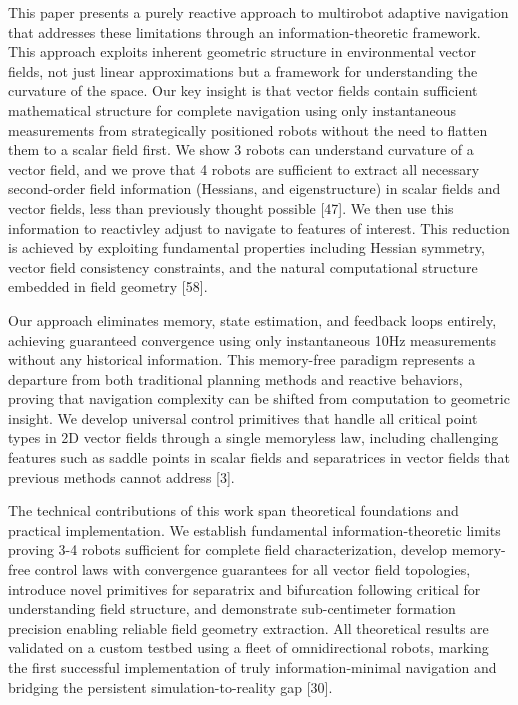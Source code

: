 \documentclass{article}
\begin{document}
This paper presents a purely reactive approach to multirobot adaptive navigation that addresses these limitations through an information-theoretic framework. This approach exploits inherent geometric structure in environmental vector fields, not just linear approximations but a framework for understanding the curvature of the space. Our key insight is that vector fields contain sufficient mathematical structure for complete navigation using only instantaneous measurements from strategically positioned robots without the need to flatten them to a scalar field first. We show 3 robots can understand curvature of a vector field, and we prove that 4 robots are sufficient to extract all necessary second-order field information (Hessians, and eigenstructure) in scalar fields and vector fields,  less than previously thought possible [47].  We then use this information to reactivley adjust to navigate to features of interest. This reduction is achieved by exploiting fundamental properties including Hessian symmetry, vector field consistency constraints, and the natural computational structure embedded in field geometry [58].

Our approach eliminates memory, state estimation, and feedback loops entirely, achieving guaranteed convergence using only instantaneous 10Hz measurements without any historical information. This memory-free paradigm represents a departure from both traditional planning methods and reactive behaviors, proving that navigation complexity can be shifted from computation to geometric insight. We develop universal control primitives that handle all critical point types in 2D vector fields through a single memoryless law, including challenging features such as saddle points in scalar fields and separatrices in vector fields that previous methods cannot address [3].

The technical contributions of this work span theoretical foundations and practical implementation. We establish fundamental information-theoretic limits proving 3-4 robots sufficient for complete field characterization, develop memory-free control laws with convergence guarantees for all vector field topologies, introduce novel primitives for separatrix and bifurcation following critical for understanding field structure, and demonstrate sub-centimeter formation precision enabling reliable field geometry extraction. All theoretical results are validated on a custom testbed using a fleet of omnidirectional robots, marking the first successful implementation of truly information-minimal navigation and bridging the persistent simulation-to-reality gap [30].
\end{document}
